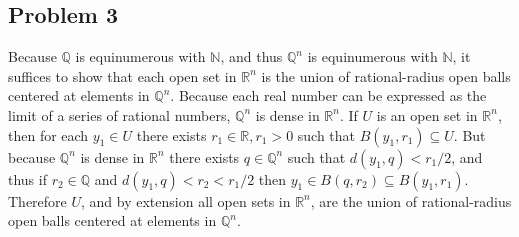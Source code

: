 \documentclass{article}
\begin{document}
\subsection*{Problem 3}
Because \(\mathbb{Q}\) is equinumerous with \(\mathbb{N}\), and thus \(\mathbb{Q}^n\) is equinumerous with \(\mathbb{N}\), it suffices to show that each open set in \(\mathbb{R}^n\) is the union of rational-radius open balls centered at elements in \(\mathbb{Q}^n\). Because each real number can be expressed as the limit of a series of rational numbers, \(\mathbb{Q}^n\) is dense in \(\mathbb{R}^n\). If \(U\) is an open set in \(\mathbb{R}^n\), then for each \(y_1\in U\) there exists \(r_1\in\mathbb{R}, r_1>0\) such that \(B(y_1,r_1)\subseteq U\). But because \(\mathbb{Q}^n\) is dense in \(\mathbb{R}^n\) there exists \(q\in\mathbb{Q}^n\) such that \(d(y_1, q)<r_1/2\), and thus if \(r_2\in\mathbb{Q}\) and \(d(y_1,q)<r_2<r_1/2\) then \(y_1\in B(q,r_2)\subseteq B(y_1,r_1)\). Therefore \(U\), and by extension all open sets in \(\mathbb{R}^n\), are the union of rational-radius open balls centered at elements in \(\mathbb{Q}^n\).
\end{document}
